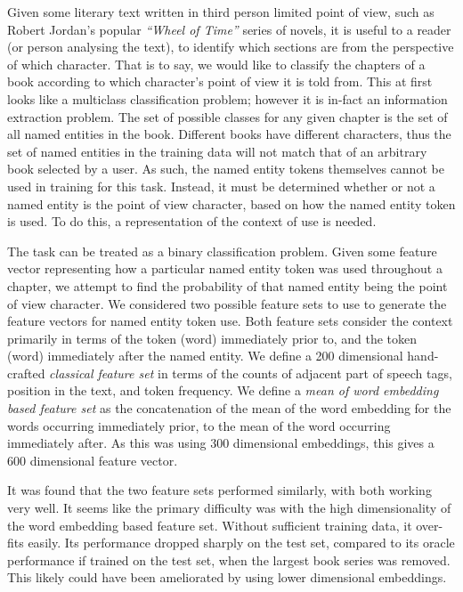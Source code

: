 \documentclass{book}
\begin{document}
Given some literary text written in third person limited point of view, such as Robert Jordan's popular \textit{``Wheel of Time''} series of novels,
it is useful to a reader (or person analysing the text), to identify which sections are from the perspective of which character.
That is to say, we would like to classify the chapters of a book according to which character's point of view it is told from.
This at first looks like a multiclass classification problem;
however it is in-fact an information extraction problem.
The set of possible classes for any given chapter is the set of all named entities in the book.
Different books have different characters,
thus the set of named entities in the training data will not match that of an arbitrary book selected by a user.
As such, the named entity tokens themselves cannot be used in training for this task.
Instead, it must be determined whether or not a named entity is the point of view character, based on how the named entity token is used.
To do this, a representation of the context of use is needed.


The task can be treated as a binary classification problem.
Given some feature vector representing how a particular named entity token was used throughout a chapter,
we attempt to find the probability of that named entity being the point of view character.
We considered two possible feature sets to use to generate the feature vectors for named entity token use.
Both feature sets consider the context primarily in terms of the token (word) immediately prior to, and the token (word) immediately after the named entity.
We define a 200 dimensional hand-crafted \emph{classical feature set} in terms of the counts of adjacent part of speech tags, position in the text, and token frequency.
We define a \emph{mean of word embedding based feature set} as the concatenation of the mean of the word embedding for the words occurring immediately prior, to the mean of the word occurring immediately after.
As this was using 300 dimensional embeddings, this gives a 600 dimensional feature vector.


It was found that the two feature sets performed similarly, with both working very well.
It seems like the primary difficulty was with the high dimensionality of the word embedding based feature set.
Without sufficient training data, it over-fits easily.
Its performance dropped sharply on the test set, compared to its oracle performance if trained on the test set,
when the largest book series was removed.
This likely could have been ameliorated by using lower dimensional embeddings.
\end{document}
